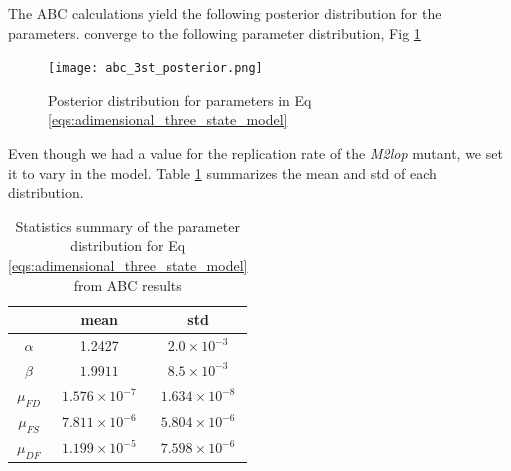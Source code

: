 \documentclass{article}
\begin{document}
The ABC calculations yield the following posterior distribution for the parameters. converge to the following parameter distribution, Fig \ref{fig:posterior_abc_3st}

\begin{figure}[H]
    \centering
    \texttt{[image: abc\_3st\_posterior.png]}
    \caption{Posterior distribution for parameters in Eq \ref{eqs:adimensional_three_state_model}}
    \label{fig:posterior_abc_3st}
\end{figure}

Even though we had a value for the replication rate of the \textit{M2lop} mutant, we set it to vary in the model. Table \ref{tab:abc_3st_params} summarizes the mean and std of each distribution.

\begin{table}[H]
    \centering
    \begin{tabular}{c|c|c}
    \hline
    & \textbf{mean} & \textbf{std} \\\hline
     $\alpha$ & 1.2427   & $2.0 \times 10^{-3}$ \\
     $\beta$  & $1.9911$ & $8.5 \times 10^{-3}$\\
     $\mu_{FD}$    & $1.576\times 10^{-7}$ & $1.634\times 10^{-8}$ \\
     $\mu_{FS}$    & $7.811\times 10^{-6}$ & $5.804\times 10^{-6}$ \\
     $\mu_{DF}$    & $1.199\times 10^{-5}$ & $7.598\times 10^{-6}$ \\\hline
    \end{tabular}
    \caption{Statistics summary of the parameter distribution for Eq \ref{eqs:adimensional_three_state_model} from ABC results}
    \label{tab:abc_3st_params}
\end{table}
\end{document}
